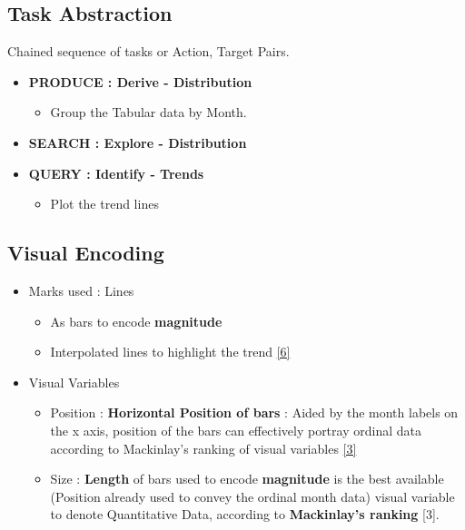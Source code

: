 \documentclass[a4paper,11pt]{article}
\begin{document}
\begin{multicols}{2}
\subsection*{Task Abstraction}
Chained sequence of tasks or {Action, Target} Pairs.
\begin{itemize}
	\item \textbf{PRODUCE : Derive - Distribution}
	\begin{itemize}
			\item Group the Tabular data by Month. 
	\end{itemize}
	\item \textbf{SEARCH : Explore - Distribution}
	\item \textbf{QUERY : Identify - Trends}
	\begin{itemize}
		\item Plot the trend lines
	\end{itemize}
\end{itemize}
\subsection*{Visual Encoding}
\begin{itemize}
	\item Marks used : Lines
	\begin{itemize}
		\item As bars to encode \textbf{magnitude}
		\item Interpolated lines to highlight the trend \ref{6}
	\end{itemize}	
	\item Visual Variables
	\begin{itemize}
		\item Position : \textbf{Horizontal Position of bars} : Aided by the month labels on the x axis, position of the bars can effectively portray ordinal data according to Mackinlay’s ranking of visual variables \ref{3}
		\item Size : \textbf{Length} of bars used to encode \textbf{magnitude} is the best available (Position already used to convey the ordinal month data) visual variable to denote Quantitative Data, according to  \textbf{Mackinlay’s ranking} [3].
	\end{itemize}
\end{itemize}

\end{multicols}
\end{document}
